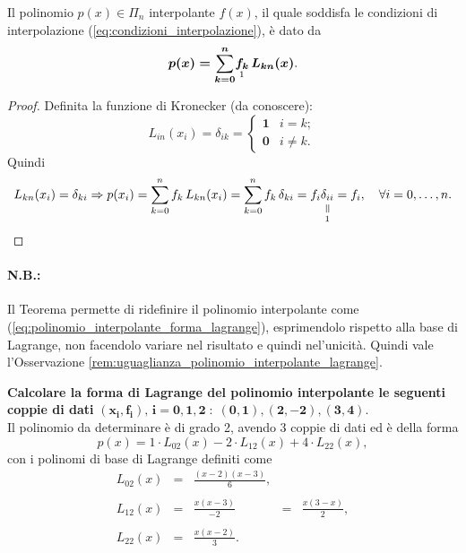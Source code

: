 \begin{theorem}
    Il polinomio $p(x)\in \Pi_n$ interpolante $f(x)$, il quale soddisfa le condizioni di interpolazione (\ref{eq:condizioni_interpolazione}), è dato da 
    \begin{equation}\label{eq:polinomio_interpolante_forma_lagrange}
        \boldsymbol{p(x)=\sum_{k=0}^{n}} \underset{\footnotemark}{\boldsymbol{f_k}}\, \boldsymbol{L_{kn}(x)}.
    \end{equation}
\end{theorem}
\begin{proof}
    Definita la funzione di Kronecker (da conoscere): 
    \begin{equation}\label{eq:formaKronecker}
        L_{in}(x_i)=\delta_{ik} = 
        \begin{cases}
            \boldsymbol 1 & i=k;\\
            \boldsymbol 0 & i\neq k.
        \end{cases}
    \end{equation}
   Quindi
   \begin{equation*}
       L_{kn}(x_i)=\delta_{ki}\Rightarrow p(x_i)=\sum_{k=0}^n f_k\, L_{kn}(x_i) = \sum_{k=0}^n f_k\, \delta_{ki} = f_i \equalto{\delta_{ii}}{1} = f_i,\quad \forall i=0,\hdots,n.
   \end{equation*}
\end{proof}

\paragraph{N.B.:} Il Teorema permette di ridefinire il polinomio interpolante come (\ref{eq:polinomio_interpolante_forma_lagrange}), esprimendolo rispetto alla base di Lagrange, non facendolo variare nel risultato e quindi nel'unicità. Quindi vale l'Osservazione \ref{rem:uguaglianza_polinomio_interpolante_lagrange}.

\begin{example}
	\textbf{Calcolare la forma di Lagrange del polinomio interpolante le seguenti coppie di dati} $\boldsymbol{(x_i, f_i),\, i=0,1,2\; :\;  (0,1),(2,-2), (3,4)}$.\\
	Il polinomio da determinare è di grado 2, avendo 3 coppie di dati ed è della forma
	\begin{equation*}
		p(x) = 1 \cdot L_{02}(x) - 2 \cdot L_{12}(x) + 4 \cdot L_{22}(x),
	\end{equation*}
	con i polinomi di base di Lagrange definiti come
	\begin{equation*}
		\begin{matrix}
			L_{02}(x) &=& \frac{(x-2)(x-3)}{6},\\\\
			L_{12}(x) &=& \frac{x(x-3)}{-2} &=& \frac{x(3-x)}{2},\\\\
			L_{22}(x) &=& \frac{x(x-2)}{3}.
		\end{matrix}
	\end{equation*}
\end{example}

